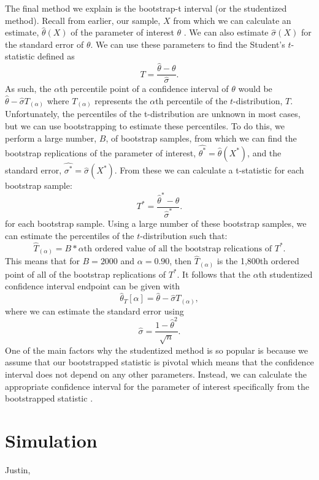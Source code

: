 \documentclass[12pt]{article}
\begin{document}
The final method we explain is the bootstrap-t interval (or the
studentized method). Recall from earlier, our sample, \(X\) from which
we can calculate an estimate, \(\hat{\theta}(X)\) of the parameter of
interest \(\theta\) \citep[\citet{Puth15}]{Efron86}. We can also
estimate \(\hat{\sigma}(X)\) for the standard error of \(\theta\). We
can use these parameters to find the Student's \(t\)-statistic defined
as \[T = \frac{\hat{\theta} - \theta}{\hat{\sigma}}.\] As such, the
\(\alpha\)th percentile point of a confidence interval of \(\theta\)
would be \(\hat{\theta} - \hat{\sigma}T_{(\alpha)}\) where
\(T_{(\alpha)}\) represents the \(\alpha\)th percentile of the
\(t\)-distribution, \(T\). Unfortunately, the percentiles of the
t-distribution are unknown in most cases, but we can use bootstrapping
to estimate these percentiles. To do this, we perform a large number,
\(B\), of bootstrap samples, from which we can find the bootstrap
replications of the parameter of interest,
\(\hat{\theta^*} = \hat{\theta}(X^*)\), and the standard error,
\(\hat{\sigma^*} = \hat{\sigma}(X^*)\). From these we can calculate a
t-statistic for each bootstrap sample:
\[T^* = \frac{\hat{\theta}^* - \hat{\theta}}{\hat{\sigma}^*}.\] for each
bootstrap sample. Using a large number of these bootstrap samples, we
can estimate the percentiles of the \(t\)-distribution such that:
\[\hat{T}_{(\alpha)} = B*\alpha\text{th ordered value of all the bootstrap relications of }T^*.\]
This means that for \(B = 2000\) and \(\alpha = 0.90\), then
\(\hat{T}_{(\alpha)}\) is the 1,800th ordered point of all of the
bootstrap replications of \(T^*\). It follows that the \(\alpha\)th
studentized confidence interval endpoint can be given with
\[\hat{\theta}_T[\alpha] = \hat{\theta} - \hat{\sigma}T_{(\alpha)},\]
where we can estimate the standard error using
\[\hat{\sigma} = \frac{1-\hat{\theta}^2}{\sqrt{n}}.\] One of the main
factors why the studentized method is so popular is because we assume
that our bootstrapped statistic is pivotal which means that the
confidence interval does not depend on any other parameters. Instead, we
can calculate the appropriate confidence interval for the parameter of
interest specifically from the bootstrapped statistic
\citep[\citet{Puth15}]{Efron86}.

\hypertarget{simulation}{%
\section{Simulation}\label{simulation}}

Justin,
\end{document}
